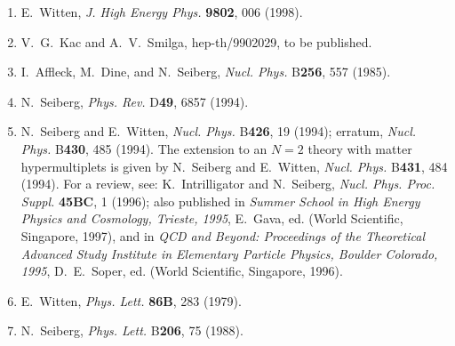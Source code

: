 \begin{enumerate}
  \item {}\label{ch29-ref-6}
  E.~Witten, \textit{J. High Energy Phys.} \textbf{9802}, 006 (1998).

  \item {}\label{ch29-ref-7}
  V.~G.~Kac and A.~V.~Smilga, hep-th/9902029, to be published.

  \item {}\label{ch29-ref-8}
  I.~Affleck, M.~Dine, and N.~Seiberg, \textit{Nucl. Phys.}
  B\textbf{256}, 557 (1985).

  \item {}\label{ch29-ref-9}
  N.~Seiberg, \textit{Phys. Rev.} D\textbf{49}, 6857 (1994).

  \item {}\label{ch29-ref-10}
  N.~Seiberg and E.~Witten, \textit{Nucl. Phys.} B\textbf{426}, 19
  (1994); erratum, \textit{Nucl. Phys.} B\textbf{430}, 485 (1994). The
  extension to an $N=2$ theory with matter hypermultiplets is given by
  N.~Seiberg and E.~Witten, \textit{Nucl. Phys.} B\textbf{431}, 484
  (1994). For a review, see: K.~Intrilligator and N.~Seiberg,
  \textit{Nucl. Phys. Proc. Suppl.} \textbf{45BC}, 1 (1996); also
  published in \textit{Summer School in High Energy Physics and
  Cosmology, Trieste, 1995}, E.~Gava, ed. (World Scientific,
  Singapore, 1997), and in \textit{QCD and Beyond: Proceedings of the
  Theoretical Advanced Study Institute in Elementary Particle Physics,
  Boulder Colorado, 1995}, D.~E.~Soper, ed. (World Scientific,
  Singapore, 1996).

  \item {}\label{ch29-ref-11}
  E.~Witten, \textit{Phys. Lett.} \textbf{86B}, 283 (1979).

  \item {}\label{ch29-ref-12}
  N.~Seiberg, \textit{Phys. Lett.} B\textbf{206}, 75 (1988).
\end{enumerate}
